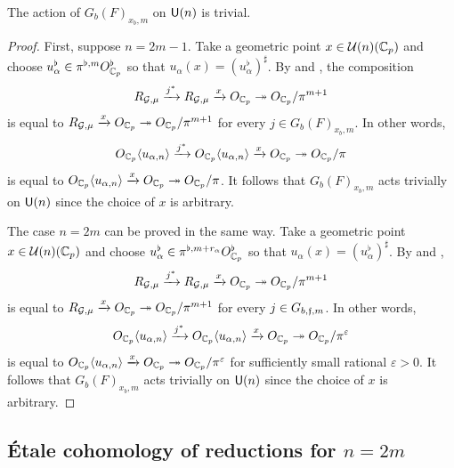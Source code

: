 \documentclass[12pt,reqno]{amsart}
\begin{document}
\begin{prop} \label{prop:inner_action_U(n)_reduction}
    The action of $G_b(F)_{x_b, m}$ on ${\mathsf{U}}(n)$ is trivial. 
\end{prop}
\begin{proof}
    First, suppose $n = 2m - 1$. Take a geometric point $x \in {\mathcal{U}}(n)(\mathbb{C}_p)$ and choose $u_\alpha^\flat \in \pi^{\flat, m}O_{\mathbb{C}_p}^\flat$ so that $u_\alpha(x) = (u_\alpha^\flat)^\sharp$. By  and , the composition
    \[
        R_{{\mathcal{G}},\mu} \xrightarrow{j^*} R_{{\mathcal{G}},\mu} \xrightarrow{x} O_{\mathbb{C}_p} \twoheadrightarrow O_{\mathbb{C}_p}/\pi^{m + 1}
    \]
    is equal to $R_{{\mathcal{G}},\mu} \xrightarrow{x} O_{\mathbb{C}_p} \twoheadrightarrow O_{\mathbb{C}_p}/\pi^{m + 1}$ for every $j \in G_b(F)_{x_b, m}$. In other words,
    \[
        O_{\mathbb{C}_p} \langle u_{\alpha, n} \rangle \xrightarrow{j^*} O_{\mathbb{C}_p} \langle u_{\alpha, n} \rangle \xrightarrow{x} O_{\mathbb{C}_p} \twoheadrightarrow O_{\mathbb{C}_p}/\pi
    \]
    is equal to $ O_{\mathbb{C}_p} \langle u_{\alpha, n} \rangle \xrightarrow{x} O_{\mathbb{C}_p} \twoheadrightarrow O_{\mathbb{C}_p}/\pi$. It follows that $G_b(F)_{x_b, m}$ acts trivially on ${\mathsf{U}}(n)$ since the choice of $x$ is arbitrary. 

    The case $n = 2m$ can be proved in the same way. Take a geometric point $x \in {\mathcal{U}}(n)(\mathbb{C}_p)$ and choose $u_\alpha^\flat \in \pi^{\flat, m + r_\alpha}O_{\mathbb{C}_p}^\flat$ so that $u_\alpha(x) = (u_\alpha^\flat)^\sharp$.  By  and , 
    \[
        R_{{\mathcal{G}},\mu} \xrightarrow{j^*} R_{{\mathcal{G}},\mu} \xrightarrow{x} O_{\mathbb{C}_p} \twoheadrightarrow O_{\mathbb{C}_p}/\pi^{m + 1}
    \]
    is equal to $R_{{\mathcal{G}},\mu} \xrightarrow{x} O_{\mathbb{C}_p} \twoheadrightarrow O_{\mathbb{C}_p}/\pi^{m + 1}$ for every $j \in G_{b, {\mathfrak{f}}, m}$. In other words,
    \[
        O_{\mathbb{C}_p} \langle u_{\alpha, n} \rangle \xrightarrow{j^*} O_{\mathbb{C}_p} \langle u_{\alpha, n} \rangle \xrightarrow{x} O_{\mathbb{C}_p} \twoheadrightarrow O_{\mathbb{C}_p}/\pi^\varepsilon
    \]
    is equal to $ O_{\mathbb{C}_p} \langle u_{\alpha, n} \rangle \xrightarrow{x} O_{\mathbb{C}_p} \twoheadrightarrow O_{\mathbb{C}_p}/\pi^\varepsilon$ for sufficiently small rational $\varepsilon > 0$. It follows that $G_b(F)_{x_b, m}$ acts trivially on ${\mathsf{U}}(n)$ since the choice of $x$ is arbitrary. 
\end{proof}

\subsection{\'{E}tale cohomology of reductions for $n = 2m$} \label{ssec:cohomology_reduction_even}
\end{document}
